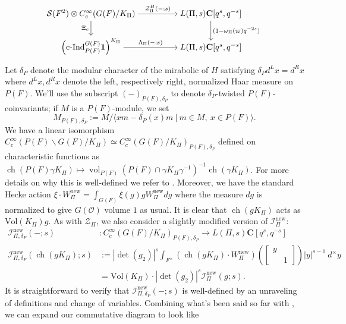 \documentclass{amsart}
\theoremstyle{plain}
\theoremstyle{plain}
\theoremstyle{remark}
\DeclareMathOperator{\ch}{ch}
\DeclareMathOperator{\vol}{vol}
\begin{document}
\[\begin{tikzcd}[ampersand replacement=\&,cramped]
	{\mathcal{S}(F^2)\otimes C_c^\infty(G(F)/K_\Pi)} \&\& {L(\Pi,s)\mathbf{C}[q^s,q^{-s}]} \\
	{\left(\mathrm{c}\text{-}\mathrm{Ind}_{P(F)}^{G(F)}\mathbf{1}\right)^{K_\Pi}} \&\& {L(\Pi,s)\mathbf{C}[q^s,q^{-s}]}
	\arrow["{\mathcal{Z}_\Pi^H(-;s)}", from=1-1, to=1-3]
	\arrow["{\Xi_c}"', from=1-1, to=2-1]
	\arrow["{(1-\omega_\Pi(\varpi)q^{-2s})}", from=1-3, to=2-3]
	\arrow["{\Lambda_\Pi(-;s)}", from=2-1, to=2-3]
\end{tikzcd}\]

\noindent Let $\delta_P$ denote the modular character of the mirabolic of $H$ satisfying $\delta_P d^Lx=d^Rx$ where $d^Lx,d^Rx$ denote the left, respectively right, normalized Haar measure on $P(F)$. We'll use the subscript $(-)_{P(F),\delta_P}$ to denote $\delta_P$-twisted $P(F)$-coinvariants; if $M$ is a $P(F)$-module, we set 
$$M_{P(F),\delta_P}:=M/\langle xm-\delta_P(x)m\ |\ m\in M,\ x\in P(F)\rangle.$$
We have a linear isomorphism $C_c^\infty(P(F)\backslash G(F)/K_\Pi)\simeq C_c^\infty(G(F)/K_\Pi)_{P(F),\delta_P}$ defined on characteristic functions as $\ch(P(F)\gamma K_\Pi)\mapsto \vol_{P(F)}(P(F)\cap \gamma K_\Pi \gamma^{-1})^{-1} \ch(\gamma K_\Pi)$. For more details on why this is well-defined we refer to \cite[Proposition $6.1.1$]{groutides2024rankinselbergintegralstructureseuler}. Moreover, we have the standard Hecke action  $\xi\cdot W_\Pi^\mathrm{new}=\int_{G(F)}\xi(g)gW_\Pi^\mathrm{new}dg$ where the measure $dg$ is normalized to give $G(\mathcal{O})$ volume $1$ as usual. It is clear that $\ch(g K_\Pi)$ acts as $\mathrm{Vol}(K_\Pi)g$. As with $\mathcal{Z}_\Pi$, we also consider a slightly modified version of $\mathcal{I}_\Pi^\mathrm{new}$:
 \begin{align*}
     \mathcal{I}_{\Pi,\delta_P}^\mathrm{new}(-;s)&:C_c^\infty(G(F)/K_\Pi)_{P(F),\delta_P}\longrightarrow L(\Pi,s)\mathbf{C}[q^s,q^{-s}]\\ \mathcal{I}_{\Pi,\delta_P}^\mathrm{new}(\ch(gK_\Pi);s)&:= |\det(g_2)|^s\int_{F^\times} \left(\ch(gK_\Pi)\cdot W_\Pi^\mathrm{new}\right)(\left[\begin{smallmatrix}
         y & \\
         & 1
     \end{smallmatrix}\right])|y|^{s-1}\ d^\times y\\
     &=\mathrm{Vol}(K_\Pi)\cdot |\det(g_2)|^s\mathcal{I}_\Pi^\mathrm{new}(g;s).
 \end{align*}
It is straightforward to verify that $\mathcal{I}_{\Pi,\delta_P}^\mathrm{new}(-;s)$ is well-defined by an unraveling of definitions and change of variables. Combining what's been said so far with , we can expand our commutative diagram to look like
\end{document}
